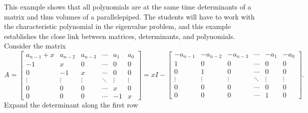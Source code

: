 \documentclass[graybox]{svmult}
\begin{document}
This example shows that all polynomials are at the same time determinants of a matrix and thus volumes of a parallelepiped. The students will have to work with the characteristic polynomial in the eigenvalue problem, and this example establishes the close link between matrices, determinants, and polynomials. Consider the matrix
{\tiny
\[
A = \left[\begin{array}{cccccc}
a_{n-1}+x & a_{n-2} & a_{n-3} & \cdots & a_1 & a_0 \\
-1 & x & 0 & \cdots & 0 & 0 \\
0 & -1 & x & \cdots & 0 & 0 \\
\vdots & \vdots & \vdots & \ddots & \vdots & \vdots \\
0 & 0 & 0 & \cdots & x & 0 \\
0 & 0 & 0 & \cdots & -1 & x
\end{array}\right] = x I - \left[\begin{array}{cccccc}
-a_{n-1} & -a_{n-2} & -a_{n-3} & \cdots & -a_1 & -a_0 \\
1 & 0 & 0 & \cdots & 0 & 0 \\
0 & 1 & 0 & \cdots & 0 & 0 \\
\vdots & \vdots & \vdots & \ddots & \vdots & \vdots \\
0 & 0 & 0 & \cdots & 0 & 0 \\
0 & 0 & 0 & \cdots & 1 & 0
\end{array}\right].
\]
}
Expand the determinant along the first row
\end{document}
